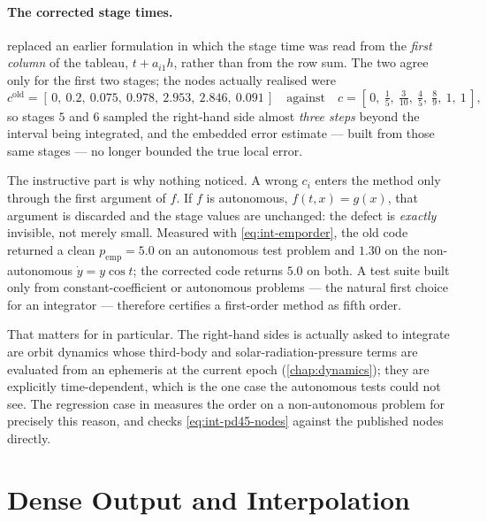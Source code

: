 \paragraph{The corrected stage times.}
\label{warn:int-pd45-nodes}
 replaced an earlier formulation in which the stage
time was read from the \emph{first column} of the tableau, $t + a_{i1}h$,
rather than from the row sum. The two agree only for the first two stages;
the nodes actually realised were
\begin{equation}
  \label{eq:int-pd45-oldnodes}
  c^{\mathrm{old}} = \left[\,0,\ 0.2,\ 0.075,\ 0.978,\ 2.953,\ 2.846,
    \ 0.091\,\right]
  \quad\text{against}\quad
  c = \left[\,0,\ \tfrac{1}{5},\ \tfrac{3}{10},\ \tfrac{4}{5},
    \ \tfrac{8}{9},\ 1,\ 1\,\right],
\end{equation}
so stages $5$ and $6$ sampled the right-hand side almost \emph{three steps}
beyond the interval being integrated, and the embedded error estimate --- built
from those same stages --- no longer bounded the true local error.

The instructive part is why nothing noticed. A wrong $c_i$ enters the method
only through the first argument of $f$. If $f$ is autonomous, $f(t,x) = g(x)$,
that argument is discarded and the stage values are unchanged: the defect is
\emph{exactly} invisible, not merely small. Measured with
\cref{eq:int-emporder}, the old code returned a clean $p_{\mathrm{emp}} = 5.0$
on an autonomous test problem and $1.30$ on the non-autonomous
$\dot y = y\cos t$; the corrected code returns $5.0$ on both. A test suite
built only from constant-coefficient or autonomous problems --- the natural
first choice for an integrator --- therefore certifies a first-order method as
fifth order.

That matters for \lupnt{} in particular. The right-hand sides  is
actually asked to integrate are orbit dynamics whose third-body and
solar-radiation-pressure terms are evaluated from an ephemeris at the current
epoch (\cref{chap:dynamics}); they are explicitly time-dependent, which is the
one case the autonomous tests could not see. The regression case
 in
 measures the order on a
non-autonomous problem for precisely this reason, and
 checks
\cref{eq:int-pd45-nodes} against the published nodes directly.

\section{Dense Output and Interpolation}
\label{sec:int-dense}


